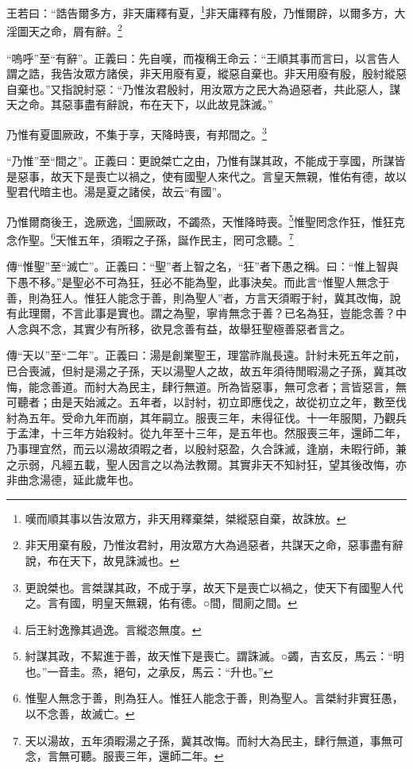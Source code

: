 王若曰：“誥告爾多方，非天庸釋有夏，\footnote{嘆而順其事以告汝眾方，非天用釋棄桀，桀縱惡自棄，故誅放。}非天庸釋有殷，乃惟爾辟，以爾多方，大淫圖天之命，屑有辭。\footnote{非天用棄有殷，乃惟汝君紂，用汝眾方大為過惡者，共謀天之命，惡事盡有辭說，布在天下，故見誅滅也。}

{\noindent\shu{}\fzkt “嗚呼”至“有辭”。正義曰：先自嘆，而複稱王命云：“王順其事而言曰，以言告人謂之誥，我告汝眾方諸侯，非天用廢有夏，縱惡自棄也。非天用廢有殷，殷紂縱惡自棄也。”又指說紂惡：“乃惟汝君殷紂，用汝眾方之民大為過惡者，共此惡人，謀天之命。其惡事盡有辭說，布在天下，以此故見誅滅。” \par}

乃惟有夏圖厥政，不集于享，天降時喪，有邦間之。\footnote{更說桀也。言桀謀其政，不成于享，故天下是喪亡以禍之，使天下有國聖人代之。言有國，明皇天無親，佑有德。○間，間廁之間。}

{\noindent\shu{}\fzkt “乃惟”至“間之”。正義曰：更說桀亡之由，乃惟有謀其政，不能成于享國，所謀皆是惡事，故天下是喪亡以禍之，使有國聖人來代之。言皇天無親，惟佑有德，故以聖君代暗主也。湯是夏之諸侯，故云“有國”。 \par}

乃惟爾商後王，逸厥逸，\footnote{后王紂逸豫其過逸。言縱恣無度。}圖厥政，不蠲烝，天惟降時喪。\footnote{紂謀其政，不絜進于善，故天惟下是喪亡。謂誅滅。○蠲，吉玄反，馬云：“明也。”一音圭。烝，絕句，之承反，馬云：“升也。”}惟聖罔念作狂，惟狂克念作聖。\footnote{惟聖人無念于善，則為狂人。惟狂人能念于善，則為聖人。言桀紂非實狂愚，以不念善，故滅亡。}天惟五年，須暇之子孫，誕作民主，罔可念聽。\footnote{天以湯故，五年須暇湯之子孫，冀其改悔。而紂大為民主，肆行無道，事無可念，言無可聽。服喪三年，還師二年。}


{\noindent\zhuan{}\fzbyks 傳“惟聖”至“滅亡”。正義曰：“聖”者上智之名，“狂”者下愚之稱。曰：“惟上智與下愚不移。”是聖必不可為狂，狂必不能為聖，此事決矣。而此言“惟聖人無念于善，則為狂人。惟狂人能念于善，則為聖人”者，方言天須暇于紂，冀其改悔，說有此理爾，不言此事是實也。謂之為聖，寧肯無念于善？已名為狂，豈能念善？中人念與不念，其實少有所移，欲見念善有益，故舉狂聖極善惡者言之。 \par}

{\noindent\zhuan{}\fzbyks 傳“天以”至“二年”。正義曰：湯是創業聖王，理當祚胤長遠。計紂未死五年之前，已合喪滅，但紂是湯之子孫，天以湯聖人之故，故五年須待閒暇湯之子孫，冀其改悔，能念善道。而紂大為民主，肆行無道。所為皆惡事，無可念者；言皆惡言，無可聽者；由是天始滅之。五年者，以討紂，初立即應伐之，故從初立之年，數至伐紂為五年。受命九年而崩，其年嗣立。服喪三年，未得征伐。十一年服闋，乃觀兵于孟津，十三年方始殺紂。從九年至十三年，是五年也。然服喪三年，還師二年，乃事理宜然，而云以湯故須暇之者，以殷紂惡盈，久合誅滅，逢崩，未暇行師，兼之示弱，凡經五載，聖人因言之以為法教爾。其實非天不知紂狂，望其後改悔，亦非曲念湯德，延此歲年也。 \par}


